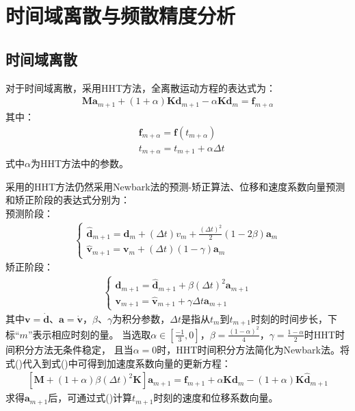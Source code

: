 \section{时间域离散与频散精度分析}
\subsection{时间域离散}
对于时间域离散，采用HHT方法，全离散运动方程的表达式为：
\begin{equation}
\begin{split}
\pmb{M}\pmb{a}_{m+1}+(1+\alpha)\pmb{K}\pmb{d}_{m+1}-\alpha\pmb{K}\pmb{d}_{m}=\pmb{f}_{m+\alpha}
\end{split}
\end{equation}
其中：
\begin{equation}
\begin{split}
    &\pmb f_{m+\alpha}=\pmb f(t_{m+\alpha})\\
    &t_{m+\alpha}=t_{m+1}+\alpha\Delta t
\end{split}
\end{equation}
式中$\alpha$为HHT方法中的参数。\par
采用的HHT方法仍然采用Newbark法的预测-矫正算法、位移和速度系数向量预测和矫正阶段的表达式分别为：\\
预测阶段：
\begin{equation}
\begin{split}
\begin{cases}
    \hat{\pmb{d}}_{m+1}=\pmb{d}_m+(\Delta t)v_m+\frac{(\Delta t)^2}{2}(1-2\beta)\pmb{a}_m\\
    \hat{\pmb{v}}_{m+1}=\pmb{v}_m+(\Delta t)(1-\gamma)\pmb{a}_m
\end{cases}  
\end{split}
\end{equation}
矫正阶段：
\begin{equation}
\begin{split}
\begin{cases}
     \pmb{d}_{m+1}=\hat{\pmb{d}}_{m+1}+\beta(\Delta t)^2\pmb{a}_{m+1}\\
     \pmb{v}_{m+1}=\hat{\pmb{v}}_{m+1}+\gamma\Delta t\pmb{a}_{m+1}
\end{cases}  
\end{split}
\end{equation}
其中$\pmb{v}=\dot{\pmb{d}}$、$\pmb{a}=\dot{\pmb{v}}$，$\beta$、$\gamma$为积分参数，$\Delta t$是指从$t_m$到$t_{m+1}$时刻的时间步长，下标“$m$”表示相应时刻的量。
当选取$\alpha\in[\frac{-1}{3},0]$，$\beta=\frac{(1-\alpha)^2}{4}$，$\gamma=\frac{1-\alpha}{2}$时HHT时间积分方法无条件稳定，
且当$\alpha=0$时，HHT时间积分方法简化为Newbark法。将式()代入到式()中可得到加速度系数向量的更新方程：
\begin{equation}
\begin{split}
[\pmb{M}+(1+\alpha)\beta(\Delta t)^2\pmb{K}]\pmb{a}_{m+1}=\pmb{f}_{m+1}+\alpha\pmb{K}\pmb{d}_m-(1+\alpha)\pmb{K}\hat{\pmb{d}}_{m+1}
\end{split}
\end{equation}
求得$\pmb{a}_{m+1}$后，可通过式()计算$t_{m+1}$时刻的速度和位移系数向量。
